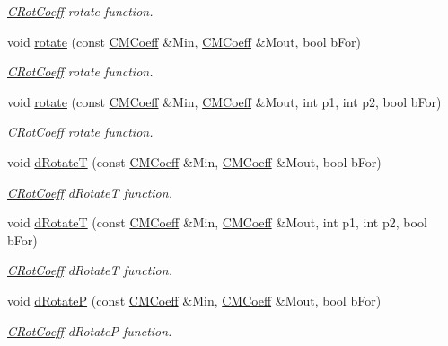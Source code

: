\begin{DoxyCompactItemize}
\begin{DoxyCompactList}\small\item\em \hyperlink{classCRotCoeff}{C\-Rot\-Coeff} rotate function. \end{DoxyCompactList}\item 
void \hyperlink{classCRotCoeff_a319c60548de84e430bd55f17d020fa3f}{rotate} (const \hyperlink{classCMCoeff}{C\-M\-Coeff} \&Min, \hyperlink{classCMCoeff}{C\-M\-Coeff} \&Mout, bool b\-For)
\begin{DoxyCompactList}\small\item\em \hyperlink{classCRotCoeff}{C\-Rot\-Coeff} rotate function. \end{DoxyCompactList}\item 
void \hyperlink{classCRotCoeff_ab93dd694803d34505c026b6d48bb6d25}{rotate} (const \hyperlink{classCMCoeff}{C\-M\-Coeff} \&Min, \hyperlink{classCMCoeff}{C\-M\-Coeff} \&Mout, int p1, int p2, bool b\-For)
\begin{DoxyCompactList}\small\item\em \hyperlink{classCRotCoeff}{C\-Rot\-Coeff} rotate function. \end{DoxyCompactList}\item 
void \hyperlink{classCRotCoeff_a73c21837871db96b643b0e9ccf77a6b4}{d\-Rotate\-T} (const \hyperlink{classCMCoeff}{C\-M\-Coeff} \&Min, \hyperlink{classCMCoeff}{C\-M\-Coeff} \&Mout, bool b\-For)
\begin{DoxyCompactList}\small\item\em \hyperlink{classCRotCoeff}{C\-Rot\-Coeff} d\-Rotate\-T function. \end{DoxyCompactList}\item 
void \hyperlink{classCRotCoeff_ab40b0a7225f78c026e488950545a33d6}{d\-Rotate\-T} (const \hyperlink{classCMCoeff}{C\-M\-Coeff} \&Min, \hyperlink{classCMCoeff}{C\-M\-Coeff} \&Mout, int p1, int p2, bool b\-For)
\begin{DoxyCompactList}\small\item\em \hyperlink{classCRotCoeff}{C\-Rot\-Coeff} d\-Rotate\-T function. \end{DoxyCompactList}\item 
void \hyperlink{classCRotCoeff_a8fc43b5ba7290e8f59fe124105445542}{d\-Rotate\-P} (const \hyperlink{classCMCoeff}{C\-M\-Coeff} \&Min, \hyperlink{classCMCoeff}{C\-M\-Coeff} \&Mout, bool b\-For)
\begin{DoxyCompactList}\small\item\em \hyperlink{classCRotCoeff}{C\-Rot\-Coeff} d\-Rotate\-P function. \end{DoxyCompactList}\item 

\end{DoxyCompactItemize}
